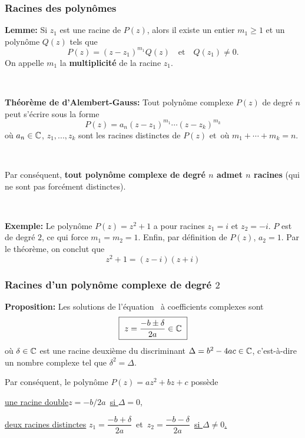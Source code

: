 \begin{frame}%
\frametitle{\bf Racines des polyn\^omes} 
\medskip 

\vspace*{1mm} 

\pause
{\bf Lemme:} 
Si $z_1$ est une racine de $P(z)$, alors il existe un entier $m_1\geq 1$ 
et un polyn\^ome $Q(z)$ tels que 
$$
P(z)=(z-z_1)^{m_1} Q(z)\quad\mbox{et}\quad Q(z_1)\neq 0.
$$ 
On appelle $m_1$ la {\bf multiplicit\'e} de la racine $z_1$. 
\vspace*{1mm} 

\

\pause
{\bf Th\'eor\`eme de d'Alembert-Gauss:} 
Tout polyn\^ome complexe $P(z)$ de degr\'e $n$ peut s'écrire sous la forme 
$$ 
P(z) = a_n (z-z_1)^{m_1} \cdots (z-z_k)^{m_k} 
$$
o\`u $a_n\in\mathbb C$, $z_1,...,z_k$ sont les racines distinctes de $P(z)$ 
et\ où $m_1+\cdots+m_k=n$. 
\vspace*{1mm} 

\

\pause
{Par cons\'equent, {\bf tout polyn\^ome complexe de degr\'e $n$ admet $n$ racines} (qui ne sont pas forcément distinctes).}  

\

{\bf Exemple:} Le polynôme $P(z)=z^2+1$ a pour racines $z_1=i$ et $z_2=-i$. $P$ est de degré $2$, ce qui force $m_1=m_2=1$. Enfin, par définition de $P(z)$, $a_2=1$. Par le théorème,  on conclut que $$z^2+1= (z-i)(z+i)$$

\end{frame}


\begin{frame}
\frametitle{\bf Racines d'un polyn\^ome complexe de degr\'e $2$} 
\medskip 

{\bf Proposition:} 
Les solutions de l'\'equation\  
\`a coefficients complexes sont 
$$
\mbox{\framebox{\ $z = \dfrac{-b \pm \delta}{2a} \in \C$\ }}
$$ 
o\`u $\delta\in \mathbb C$ est une racine deuxième du discriminant 
$\Delta = b^2 - 4ac \in \mathbb C$, c'est-\`a-dire un nombre complexe tel que 
$\delta^2=\Delta$. 
\vspace*{4mm}

\pause
{Par cons\'equent, } 
le polyn\^ome $P(z)=az^2+bz+c$ possède 
\begin{itemize}
\bitem 
\underline{une racine double}\quad $z=-b/2a$\ \underline{si $\Delta=0$}, 

\bitem 
\underline{deux racines distinctes}\quad 
$z_1 = \dfrac{-b + \delta}{2a}$\ et\ $z_2 = \dfrac{-b - \delta}{2a}$\
\underline{si $\Delta\neq 0$.} 
\end{itemize}


\end{frame}

